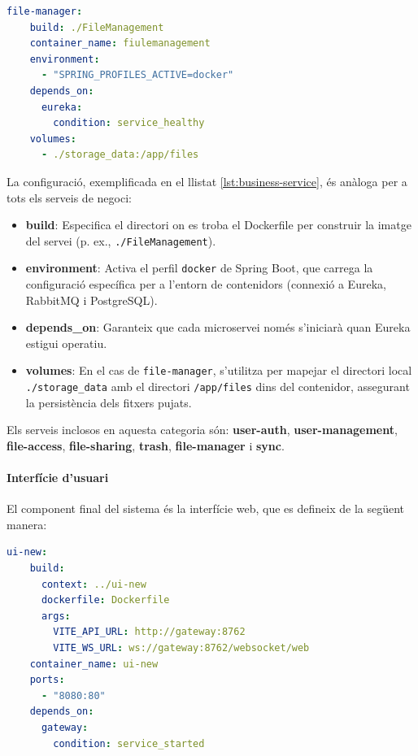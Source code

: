 \begin{lstlisting}[language=yaml, caption={Exemple de microservei de negoci a compose.yml}, label={lst:business-service}]
  file-manager:
    build: ./FileManagement
    container_name: fiulemanagement
    environment:
      - "SPRING_PROFILES_ACTIVE=docker"
    depends_on:
      eureka:
        condition: service_healthy
    volumes:
      - ./storage_data:/app/files
\end{lstlisting}

La configuració, exemplificada en el llistat \ref{lst:business-service}, és anàloga per a tots els serveis de negoci:
\begin{itemize}
  \item \textbf{build}: Especifica el directori on es troba el Dockerfile per construir la imatge del servei (p. ex., \texttt{./FileManagement}).
  \item \textbf{environment}: Activa el perfil \texttt{docker} de Spring Boot, que carrega la configuració específica per a l'entorn de contenidors (connexió a Eureka, RabbitMQ i PostgreSQL).
  \item \textbf{depends\_on}: Garanteix que cada microservei només s'iniciarà quan Eureka estigui operatiu.
  \item \textbf{volumes}: En el cas de \texttt{file-manager}, s'utilitza per mapejar el directori local \texttt{./storage\_data} amb el directori \texttt{/app/files} dins del contenidor, assegurant la persistència dels fitxers pujats.
\end{itemize}

Els serveis inclosos en aquesta categoria són: \textbf{user-auth}, \textbf{user-management}, \textbf{file-access}, \textbf{file-sharing}, \textbf{trash}, \textbf{file-manager} i \textbf{sync}.

\paragraph{Interfície d'usuari}

El component final del sistema és la interfície web, que es defineix de la següent manera:

\begin{lstlisting}[language=yaml, caption={Definició de la UI a compose.yml}, label={lst:ui-service}]
  ui-new:
    build:
      context: ../ui-new
      dockerfile: Dockerfile
      args:
        VITE_API_URL: http://gateway:8762
        VITE_WS_URL: ws://gateway:8762/websocket/web
    container_name: ui-new
    ports:
      - "8080:80"
    depends_on:
      gateway:
        condition: service_started
\end{lstlisting}

